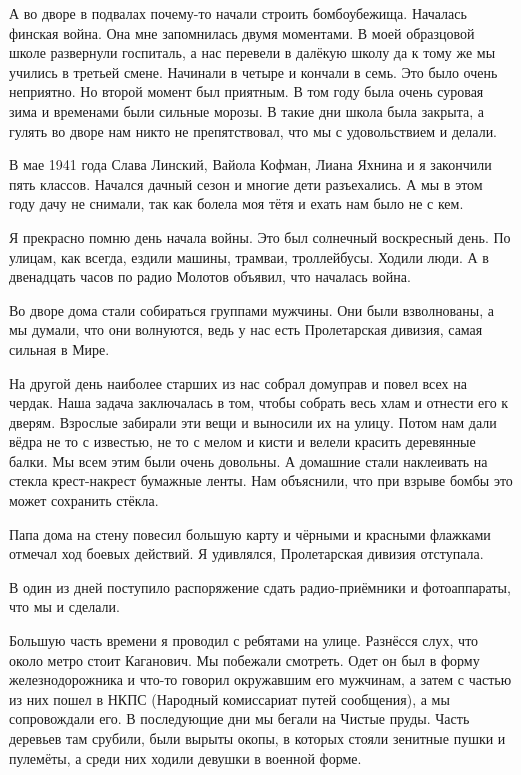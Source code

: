 А во дворе в подвалах почему-то начали строить бомбоубежища. Началась финская война. Она мне запомнилась двумя моментами. В моей образцовой школе развернули госпиталь, а нас перевели в далёкую школу да к тому же мы учились в третьей смене. Начинали в четыре и кончали в семь. Это было очень неприятно. Но второй момент был приятным. В том году была очень суровая зима и временами были сильные морозы. В такие дни школа была закрыта, а гулять во дворе нам никто не препятствовал, что мы с удовольствием и делали.

В мае 1941 года Слава Линский, Вайола Кофман, Лиана Яхнина и я закончили пять классов. Начался дачный сезон и многие дети разъехались. А мы в этом году дачу не снимали, так как болела моя тётя и ехать нам было не с кем.

Я прекрасно помню день начала войны. Это был солнечный воскресный день. По улицам, как всегда, ездили машины, трамваи, троллейбусы. Ходили люди. А в двенадцать часов по радио Молотов объявил, что началась война.

Во дворе дома стали собираться группами мужчины. Они были взволнованы, а мы думали, что они волнуются, ведь у нас есть Пролетарская дивизия, самая сильная в Мире.

На другой день наиболее старших из нас собрал дом\-управ и повел всех на чердак. Наша задача заключалась в том, чтобы собрать весь хлам и отнести его к дверям. Взрослые забирали эти вещи и выносили их на улицу. Потом нам дали вёдра не то с известью, не то с мелом и кисти и велели красить деревянные балки. Мы всем этим были очень довольны. А домашние стали наклеивать на стекла крест-накрест бумажные ленты. Нам объяснили, что при взрыве бомбы это может сохранить стёкла.

Папа дома на стену повесил большую карту и чёрными и красными флажками отмечал ход боевых действий. Я удивлялся, Пролетарская дивизия отступала.

В один из дней поступило распоряжение сдать радио-приёмники и фотоаппараты, что мы и сделали.

Большую часть времени я проводил с ребятами на улице. Разнёсся слух, что около метро стоит Каганович. Мы побежали смотреть. Одет он был в форму железнодорожника и что-то говорил окружавшим его мужчинам, а затем с частью из них пошел в НКПС (Народный комиссариат путей сообщения), а мы сопровождали его. В последующие дни мы бегали на Чистые пруды. Часть деревьев там срубили, были вырыты окопы, в которых стояли зенитные пушки и пулемёты, а среди них ходили девушки в военной форме.

